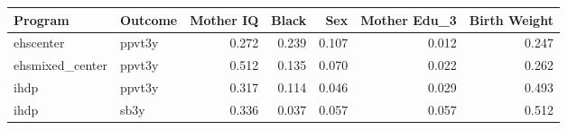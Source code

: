 \begin{table}[ht]
\centering
\begin{tabular}{llrrrrr}
  \hline
Program & Outcome & Mother IQ & Black & Sex & Mother Edu\_3 & Birth Weight \\ 
  \hline
ehscenter & ppvt3y & 0.272 & 0.239 & 0.107 & 0.012 & 0.247 \\ 
  ehsmixed\_center & ppvt3y & 0.512 & 0.135 & 0.070 & 0.022 & 0.262 \\ 
  ihdp & ppvt3y & 0.317 & 0.114 & 0.046 & 0.029 & 0.493 \\ 
  ihdp & sb3y & 0.336 & 0.037 & 0.057 & 0.057 & 0.512 \\ 
   \hline
\end{tabular}
\end{table}
